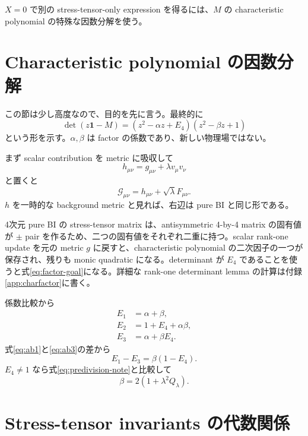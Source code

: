 \documentclass[a4paper,11pt]{ltjsreport}
\newcommand{\G}{\mathcal G}
\newcommand{\Id}{\mathbf 1}
\begin{document}
$X=0$ で別の stress-tensor-only expression を得るには、$M$ の characteristic polynomial の特殊な因数分解を使う。

\section{Characteristic polynomial の因数分解}

この節は少し高度なので、目的を先に言う。最終的に
\begin{equation}
 \det(z\Id-M)
 =(z^2-\alpha z+E_4)(z^2-\beta z+1)
 \label{eq:factor-goal}
\end{equation}
という形を示す。$\alpha,\beta$ は factor の係数であり、新しい物理場ではない。

まず scalar contribution を metric に吸収して
\begin{equation}
 h_{\mu\nu}=g_{\mu\nu}+\lambda v_\mu v_\nu
 \label{eq:hmetric}
\end{equation}
と置くと
\begin{equation}
 \G_{\mu\nu}=h_{\mu\nu}+\sqrt\lambda F_{\mu\nu}.
\end{equation}
$h$ を一時的な background metric と見れば、右辺は pure BI と同じ形である。

4次元 pure BI の stress-tensor matrix は、antisymmetric 4-by-4 matrix の固有値が $\pm$ pair を作るため、二つの固有値をそれぞれ二重に持つ。scalar rank-one update を元の metric $g$ に戻すと、characteristic polynomial の二次因子の一つが保存され、残りも monic quadratic になる。determinant が $E_4$ であることを使うと式\eqref{eq:factor-goal}になる。詳細な rank-one determinant lemma の計算は付録\ref{app:charfactor}に書く。

係数比較から
\begin{align}
 E_1&=\alpha+\beta,\label{eq:ab1}\\
 E_2&=1+E_4+\alpha\beta,\label{eq:ab2}\\
 E_3&=\alpha+\beta E_4.
 \label{eq:ab3}
\end{align}
式\eqref{eq:ab1}と\eqref{eq:ab3}の差から
\begin{equation}
 E_1-E_3=\beta(1-E_4).
 \label{eq:E1E3-beta}
\end{equation}
$E_4\neq1$ なら式\eqref{eq:predivision-note}と比較して
\begin{equation}
 \beta=2(1+\lambda^2Q_\lambda).
 \label{eq:beta-flow}
\end{equation}

\section{Stress-tensor invariants の代数関係}
\end{document}
